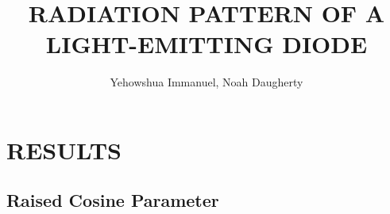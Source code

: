 \documentclass[10pt,a4paper]{article}
\title{RADIATION PATTERN OF A LIGHT-EMITTING DIODE}
\author{Yehowshua Immanuel, Noah Daugherty}
\begin{document}
\maketitle
\tableofcontents
\newpage




\section{RESULTS}
\subsection{Raised Cosine Parameter}




\newpage

\end{document}
